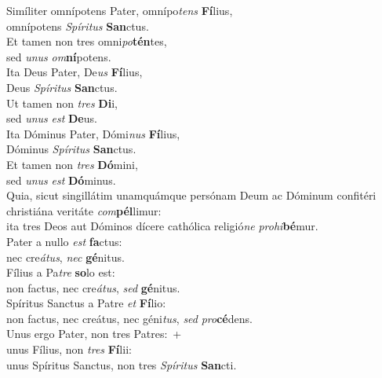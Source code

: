 \oddverse Simíliter omnípotens Pater, omnípo\textit{tens} \textbf{Fí}lius,~\*\\
\oddverse omnípotens \textit{Spí}\textit{ri}\textit{tus} \textbf{San}ctus.\\
\evenverse Et tamen non tres omni\textit{po}\textbf{tén}tes,~\*\\
\evenverse sed \textit{u}\textit{nus} \textit{om}\textbf{ní}potens.\\
\oddverse Ita Deus Pater, De\textit{us} \textbf{Fí}lius,~\*\\
\oddverse Deus \textit{Spí}\textit{ri}\textit{tus} \textbf{San}ctus.\\
\evenverse Ut tamen non \textit{tres} \textbf{Di}i,~\*\\
\evenverse sed \textit{u}\textit{nus} \textit{est} \textbf{De}us.\\
\oddverse Ita Dóminus Pater, Dómi\textit{nus} \textbf{Fí}lius,~\*\\
\oddverse Dóminus \textit{Spí}\textit{ri}\textit{tus} \textbf{San}ctus.\\
\evenverse Et tamen non \textit{tres} \textbf{Dó}mini,~\*\\
\evenverse sed \textit{u}\textit{nus} \textit{est} \textbf{Dó}minus.\\
\oddverse Quia, sicut singillátim unamquámque persónam Deum ac Dóminum confitéri christiána veritáte \textit{com}\textbf{pél}limur:~\*\\
\oddverse ita tres Deos aut Dóminos dícere cathólica religió\textit{ne} \textit{pro}\textit{hi}\textbf{bé}mur.\\
\evenverse Pater a nullo \textit{est} \textbf{fa}ctus:~\*\\
\evenverse nec cre\textit{á}\textit{tus}, \textit{nec} \textbf{gé}nitus.\\
\oddverse Fílius a Pa\textit{tre} \textbf{so}lo est:~\*\\
\oddverse non factus, nec cre\textit{á}\textit{tus}, \textit{sed} \textbf{gé}nitus.\\
\evenverse Spíritus Sanctus a Patre \textit{et} \textbf{Fí}lio:~\*\\
\evenverse non factus, nec creátus, nec géni\textit{tus}, \textit{sed} \textit{pro}\textbf{cé}dens.\\
\oddverse Unus ergo Pater, non tres Patres:~+\\
\oddverse  unus Fílius, non \textit{tres} \textbf{Fí}lii:~\*\\
\oddverse unus Spíritus Sanctus, non tres \textit{Spí}\textit{ri}\textit{tus} \textbf{San}cti.\\

